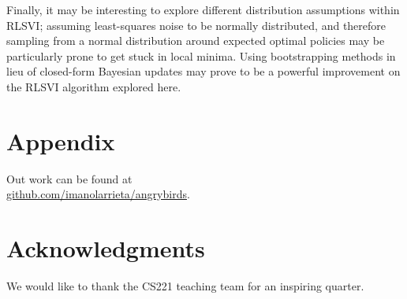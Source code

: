 \documentclass[fleqn,10pt]{SelfArx} %
\begin{document}
Finally, it may be interesting to explore different distribution assumptions within RLSVI; assuming least-squares noise to be normally distributed, and therefore sampling from a normal distribution around expected optimal policies may be particularly prone to get stuck in local minima. Using bootstrapping methods in lieu of closed-form Bayesian updates may prove to be a powerful improvement on the RLSVI algorithm explored here.

\section*{Appendix} %
Out work can be found at \\ \url{github.com/imanolarrieta/angrybirds}.

\section*{Acknowledgments} %
We would like to thank the CS221 teaching team for an inspiring quarter.




\nocite{*}

\end{document}
